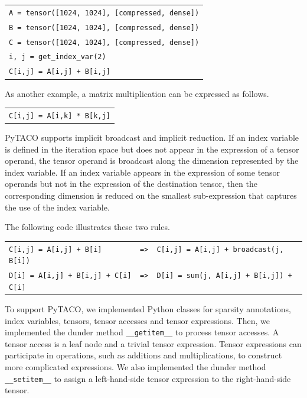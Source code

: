 \documentclass[10pt]{article}
\newcommand{\exam}{\begin{flushleft}\scriptsize\begin{tabular}{l}}
\newcommand{\maxe}{\end{tabular}\end{flushleft}}
\begin{document}
\exam
\verb"A = tensor([1024, 1024], [compressed, dense])" \\
\verb"B = tensor([1024, 1024], [compressed, dense])" \\
\verb"C = tensor([1024, 1024], [compressed, dense])" \\
\verb"i, j = get_index_var(2)" \\
\verb"C[i,j] = A[i,j] + B[i,j]" \\
\maxe

As another example, a matrix multiplication can be expressed as follows.

\exam
\verb"C[i,j] = A[i,k] * B[k,j]" \\
\maxe

PyTACO supports implicit broadcast and implicit reduction. If an index variable is defined in the iteration space but does not appear in the expression of a tensor operand, the tensor operand is broadcast along the dimension represented by the index variable. If an index variable appears in the expression of some tensor operands but not in the expression of the destination tensor, then the corresponding dimension is reduced on the smallest sub-expression that captures the use of the index variable.

The following code illustrates these two rules.

\exam
\verb"C[i,j] = A[i,j] + B[i]         =>  C[i,j] = A[i,j] + broadcast(j, B[i])" \\ 
\verb"D[i] = A[i,j] + B[i,j] + C[i]  =>  D[i] = sum(j, A[i,j] + B[i,j]) + C[i]" \\
\maxe

To support PyTACO, we implemented Python classes for sparsity annotations, index variables, tensors, tensor accesses and tensor expressions. Then, we implemented the dunder method \texttt{\_\_getitem\_\_} to process tensor accesses. A tensor access is a leaf node and a trivial tensor expression. Tensor expressions can participate in operations, such as additions and multiplications, to construct more complicated expressions. We also implemented the dunder method \texttt{\_\_setitem\_\_} to assign a left-hand-side tensor expression to the right-hand-side tensor. 
\end{document}

